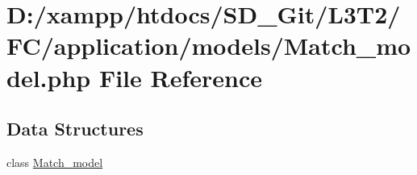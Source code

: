 \hypertarget{_match__model_8php}{}\section{D\+:/xampp/htdocs/\+S\+D\+\_\+\+Git/\+L3\+T2/\+F\+C/application/models/\+Match\+\_\+model.php File Reference}
\label{_match__model_8php}
\subsection*{Data Structures}
\begin{DoxyCompactItemize}
\item 
class \hyperlink{class_match__model}{Match\+\_\+model}
\end{DoxyCompactItemize}
